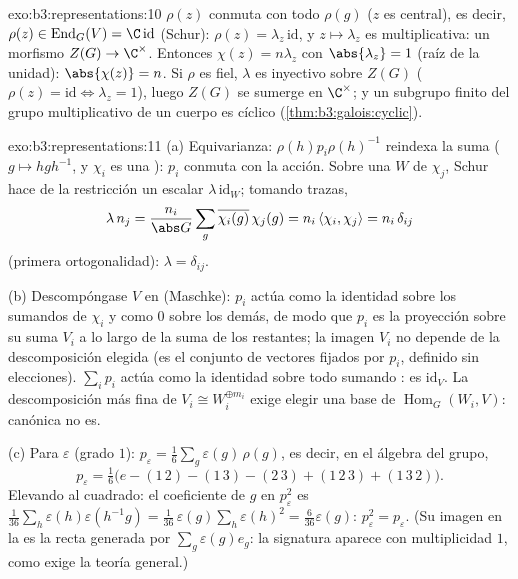\begin{solution}{exo:b3:representations:10}
$\rho(z)$ conmuta con todo $\rho(g)$ ($z$ es central), es decir,
$\rho(z) \in \operatorname{End}_G(V) = \C\,\mathrm{id}$ (Schur):
$\rho(z) = \lambda_z\,\mathrm{id}$, y $z \mapsto \lambda_z$ es
multiplicativa: un morfismo $Z(G) \to \C^\times$. Entonces
$\chi(z) = n\lambda_z$ con $\abs{\lambda_z} = 1$ (raíz de la unidad):
$\abs{\chi(z)} = n$. Si $\rho$ es fiel, $\lambda$ es inyectivo sobre
$Z(G)$ ($\rho(z) = \mathrm{id} \iff \lambda_z =
1$), luego $Z(G)$ se sumerge en $\C^\times$; y un subgrupo finito del
grupo multiplicativo de un cuerpo es cíclico
(\cref{thm:b3:galois:cyclic}).
\end{solution}

\begin{solution}{exo:b3:representations:11}
(a) Equivarianza: $\rho(h)p_i\rho(h)^{-1}$ reindexa la suma
($g \mapsto hgh^{-1}$, y $\chi_i$ es una
): $p_i$
conmuta con la acción. Sobre una
 $W$ de
 $\chi_j$, Schur hace
de la restricción un escalar $\lambda\,\mathrm{id}_W$; tomando trazas,
\[
\lambda\,n_j = \frac{n_i}{\abs G}\sum_g
\overline{\chi_i(g)}\,\chi_j(g) = n_i\,\langle\chi_i,
\chi_j\rangle = n_i\,\delta_{ij}
\]
(primera ortogonalidad): $\lambda = \delta_{ij}$.

(b) Descompóngase $V$ en
 (Maschke): $p_i$ actúa
como la identidad sobre los sumandos de
 $\chi_i$ y como $0$
sobre los demás, de modo que $p_i$ es la proyección sobre su suma $V_i$
a lo largo de la suma de los restantes; la imagen $V_i$ no depende de la
descomposición elegida (es el conjunto de vectores fijados por $p_i$,
definido sin elecciones). $\sum_ip_i$ actúa como la identidad sobre todo
sumando : es
$\mathrm{id}_V$. La descomposición más fina de
$V_i \cong W_i^{\oplus m_i}$ exige elegir una base de
$\operatorname{Hom}_G(W_i, V)$: canónica no es.

(c) Para $\varepsilon$ (grado $1$): $p_\varepsilon =
\frac1{6}\sum_{g}\varepsilon(g)\,\rho(g)$, es decir, en el álgebra del
grupo,
\[
p_\varepsilon = \tfrac16\bigl(e - (1\,2) - (1\,3) - (2\,3)
+ (1\,2\,3) + (1\,3\,2)\bigr) .
\]
Elevando al cuadrado: el coeficiente de $g$ en $p_\varepsilon^2$ es
$\frac1{36}\sum_{h}\varepsilon(h)\varepsilon(h^{-1}g) =
\frac1{36}\,\varepsilon(g)\sum_h\varepsilon(h)^2 =
\frac{6}{36}\varepsilon(g)$: $p_\varepsilon^2 =
p_\varepsilon$. (Su imagen en la
 es la
recta generada por $\sum_g\varepsilon(g)e_g$: la
 signatura aparece
con multiplicidad $1$, como exige la teoría general.)
\end{solution}

